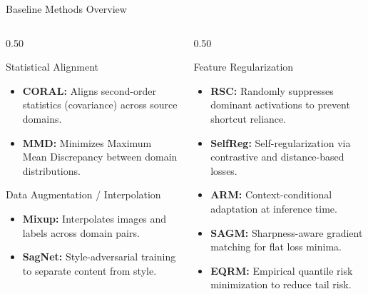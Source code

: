 \documentclass[t, aspectratio=169]{beamer} %
\begin{document}
\begin{frame}{Baseline Methods Overview}
	\begin{columns}[T]
		\begin{column}{0.50\textwidth}
			\begin{block}{Statistical Alignment}
				\small
				\begin{itemize}
					\item \textbf{CORAL:} Aligns second-order statistics (covariance) across source domains.
					\item \textbf{MMD:} Minimizes Maximum Mean Discrepancy between domain distributions.
				\end{itemize}
			\end{block}
			\vspace{0.1cm}
			\begin{block}{Data Augmentation / Interpolation}
				\small
				\begin{itemize}
					\item \textbf{Mixup:} Interpolates images and labels across domain pairs.
					\item \textbf{SagNet:} Style-adversarial training to separate content from style.
				\end{itemize}
			\end{block}
		\end{column}
		\begin{column}{0.50\textwidth}
			\begin{alertblock}{Feature Regularization}
				\small
				\begin{itemize}
					\item \textbf{RSC:} Randomly suppresses dominant activations to prevent shortcut reliance.
					\item \textbf{SelfReg:} Self-regularization via contrastive and distance-based losses.
					\item \textbf{ARM:} Context-conditional adaptation at inference time.
					\item \textbf{SAGM:} Sharpness-aware gradient matching for flat loss minima.
					\item \textbf{EQRM:} Empirical quantile risk minimization to reduce tail risk.
				\end{itemize}
			\end{alertblock}
		\end{column}
	\end{columns}
\end{frame}
\end{document}
